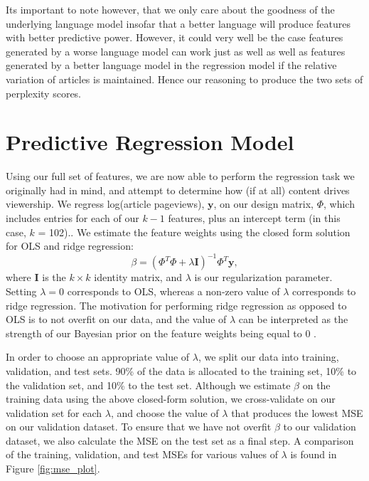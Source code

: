 \documentclass[fleqn,12pt]{SelfArx} %
\begin{document}
Its important to note however, that we only care about the goodness of the underlying language model insofar that a better language will produce features with better predictive power. However, it could very well be the case features generated by a worse language model can work just as well as well as features generated by a better language model in the regression model if the relative variation of articles is maintained. Hence our reasoning to produce the two sets of perplexity scores. 


\section{Predictive Regression Model}

Using our full set of features, we are now able to perform the regression task we originally had in mind, and attempt to determine how (if at all) content drives viewership. We regress log(article pageviews), $\mathbf{y}$, on our design matrix, $\Phi$, which includes entries for each of our $k-1$ features, plus an intercept term (in this case, $k$ = 102).. We estimate the feature weights using the closed form solution for OLS and ridge regression:
\begin{equation}
\beta = (\Phi^T\Phi + \lambda \mathbf{I})^{-1}\Phi^T\mathbf{y},
\end{equation}
\noindent where $\mathbf{I}$ is the $k \times k$ identity matrix, and $\lambda$ is our regularization parameter. Setting $\lambda = 0$ corresponds to OLS, whereas a non-zero value of $\lambda$ corresponds to ridge regression. The motivation for performing ridge regression as opposed to OLS is to not overfit on our data, and the value of $\lambda$ can be interpreted as the strength of our Bayesian prior on the feature weights being equal to 0 \cite{ridgeregressionNotes}. 

In order to choose an appropriate value of $\lambda$, we split our data into training, validation, and test sets. 90\% of the data is allocated to the training set, 10\% to the validation set, and 10\% to the test set. Although we estimate $\beta$ on the training data using the above closed-form solution, we cross-validate on our validation set for each $\lambda$, and choose the value of $\lambda$ that produces the lowest MSE on our validation dataset. To ensure that we have not overfit $\beta$ to our validation dataset, we also calculate the MSE on the test set as a final step. A comparison of the training, validation, and test MSEs for various values of $\lambda$ is found in Figure \ref{fig:mse_plot}.
\end{document}
